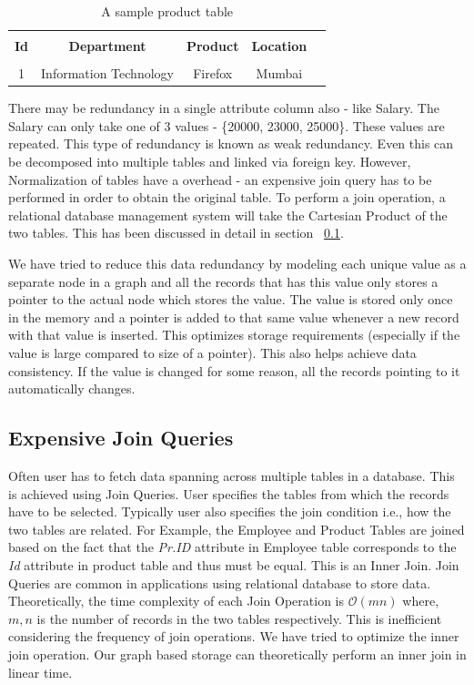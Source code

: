 \documentclass[12pt, oneside]{book}
\begin{document}
\begin{table}
    \centering
    \begin{tabular}{| c | c | c | c | @{}m{0pt}@{}}
    \hline
    \multicolumn{1}{|c|}{} & \multicolumn{1}{c|}{} & \multicolumn{1}{c|}{} & \multicolumn{1}{c|}{} &  \\
    \multicolumn{1}{|c|}{\textbf{Id}} & \multicolumn{1}{c|}{\textbf{Department}} & \multicolumn{1}{c|}{\textbf{Product}} & \multicolumn{1}{c|}{\textbf{Location}} & \\
    \multicolumn{1}{|c|}{} & \multicolumn{1}{c|}{} & \multicolumn{1}{c|}{} & \multicolumn{1}{c|}{} &  \\
    \hline
    1 & Information Technology & Firefox & Mumbai & \\ [1ex] \hline
    \end{tabular}
    \caption{A sample product table}
    \label{tab:product}
\end{table}
There may be redundancy in a single attribute column also - like Salary. The Salary can only take one of 3 values - \{20000, 23000, 25000\}. These values are repeated. This type of redundancy is known as weak redundancy. Even this can be decomposed into multiple tables and linked via foreign key. However, Normalization of tables have a overhead - an expensive join query has to be performed in order to obtain the original table. To perform a join operation, a relational database management system will take the Cartesian Product of the two tables. This has been discussed in detail in section ~\ref{sec:join}. \par
We have tried to reduce this data redundancy by modeling each unique value as a separate node in a graph and all the records that has this value only stores a pointer to the actual node which stores the value. The value is stored only once in the memory and a pointer is added to that same value whenever a new record with that value is inserted. This optimizes storage requirements (especially if the value is large compared to size of a pointer). This also helps achieve data consistency. If the value is changed for some reason, all the records pointing to it automatically changes.
\subsection{Expensive Join Queries}
\label{sec:join}
Often user has to fetch data spanning across multiple tables in a database. This is achieved using Join Queries. User specifies the tables from which the records have to be selected. Typically user also specifies the join condition i.e., how the two tables are related. For Example, the Employee and Product Tables are joined based on the fact that the \emph{Pr.ID} attribute in Employee table corresponds to the \emph{Id} attribute in product table and thus must be equal. This is an Inner Join. Join Queries are common in applications using relational database to store data. Theoretically, the time complexity of each Join Operation is $\mathcal{O}\left( mn \right)$ where, $m, n$ is the number of records in the two tables respectively. This is inefficient considering the frequency of join operations. We have tried to optimize the inner join operation. Our graph based storage can theoretically perform an inner join in linear time. 
\end{document}
